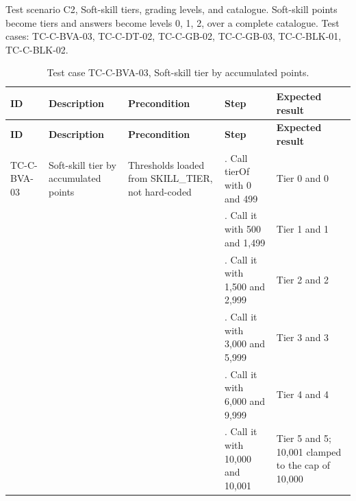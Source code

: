 Test scenario C2, Soft-skill tiers, grading levels, and catalogue. Soft-skill points become tiers and answers become levels 0, 1, 2, over a complete catalogue. Test cases: TC-C-BVA-03, TC-C-DT-02, TC-C-GB-02, TC-C-GB-03, TC-C-BLK-01, TC-C-BLK-02.

{\small
\begin{longtable}{|>{\raggedright\arraybackslash}p{}|>{\raggedright\arraybackslash}p{}|>{\raggedright\arraybackslash}p{}|>{\raggedright\arraybackslash}p{}|>{\raggedright\arraybackslash}p{}|}
\caption{Test case TC-C-BVA-03, Soft-skill tier by accumulated points.} \\
\hline
\textbf{ID} & \textbf{Description} & \textbf{Precondition} & \textbf{Step} & \textbf{Expected result} \\ \hline
\endfirsthead
\hline
\textbf{ID} & \textbf{Description} & \textbf{Precondition} & \textbf{Step} & \textbf{Expected result} \\ \hline
\endhead
TC-C-BVA-03 & Soft-skill tier by accumulated points & Thresholds loaded from SKILL\_TIER, not hard-coded & 1. Call tierOf with 0 and 499 & Tier 0 and 0 \\ \hline
 &  &  & 2. Call it with 500 and 1,499 & Tier 1 and 1 \\ \hline
 &  &  & 3. Call it with 1,500 and 2,999 & Tier 2 and 2 \\ \hline
 &  &  & 4. Call it with 3,000 and 5,999 & Tier 3 and 3 \\ \hline
 &  &  & 5. Call it with 6,000 and 9,999 & Tier 4 and 4 \\ \hline
 &  &  & 6. Call it with 10,000 and 10,001 & Tier 5 and 5; 10,001 clamped to the cap of 10,000 \\ \hline
\end{longtable}
}


